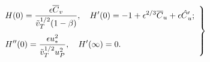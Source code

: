 \documentclass[lineno]{jfm}
\begin{document}




\begin{equation}
\left. \begin{array}{l}
\displaystyle
H(0) = \frac{\epsilon \overline{C}_v}{\tilde{v}^{{1}/{2}}_T
(1- \beta)},\quad H'(0) = -1+\epsilon^{{2}/{3}} \overline{C}_u
+ \epsilon \skew5\hat{C}_u'; \\[16pt]
\displaystyle
H''(0) = \frac{\epsilon u^2_{\ast}}{\tilde{v}^{{1}/{2}}
_T u^2_P},\quad H' (\infty) = 0.
\end{array} \right\}
\end{equation}
\end{document}
